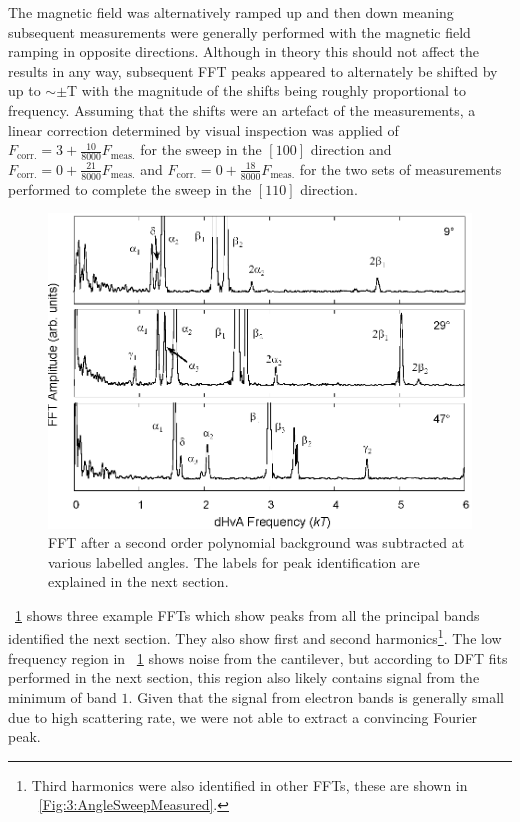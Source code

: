 The magnetic field was alternatively ramped up and then down meaning subsequent measurements were generally performed with the magnetic field ramping in opposite directions. Although in theory this should not affect the results in any way, subsequent FFT peaks appeared to alternately be shifted by up to $\sim\pm$\unit[21]{T} with the magnitude of the shifts being roughly proportional to frequency. Assuming that the shifts were an artefact of the measurements, a linear correction determined by visual inspection was applied of $F_{\textrm{corr.}} = 3 + \frac{10}{8000} F_{\textrm{meas.}}$ for the sweep in the $[100]$ direction and $F_{\textrm{corr.}} = 0 + \frac{21}{8000}  F_{\textrm{meas.}}$ and  $F_{\textrm{corr.}} = 0 + \frac{18}{8000} F_{\textrm{meas.}}$ for the two sets of measurements performed to complete the sweep in the $[110]$ direction.

\begin{figure}[htbp]
    \begin{center}
        \includegraphics[scale=0.7]{Chapter3-dHvABaFe2P2/Figures/AngleDepMeasurements/FFTExamples/FFTExamples}
        \caption{FFT after a second order polynomial background was subtracted at various labelled angles. The labels for peak identification are explained in the next section.}
        \label{Fig:3:FFTExamples}
    \end{center}
\end{figure}
\Fig~\ref{Fig:3:FFTExamples} shows three example FFTs which show peaks from all the principal bands identified the next section. They also show first and second harmonics\footnote{Third harmonics were also identified in other FFTs, these are shown in \fig~\ref{Fig:3:AngleSweepMeasured}.}. The low frequency region in \fig~\ref{Fig:3:FFTExamples} shows noise from the cantilever, but according to DFT fits performed in the next section, this region also likely contains signal from the minimum of band $1$. Given that the signal from electron bands is generally small due to high scattering rate, we were not able to extract a convincing Fourier peak.

